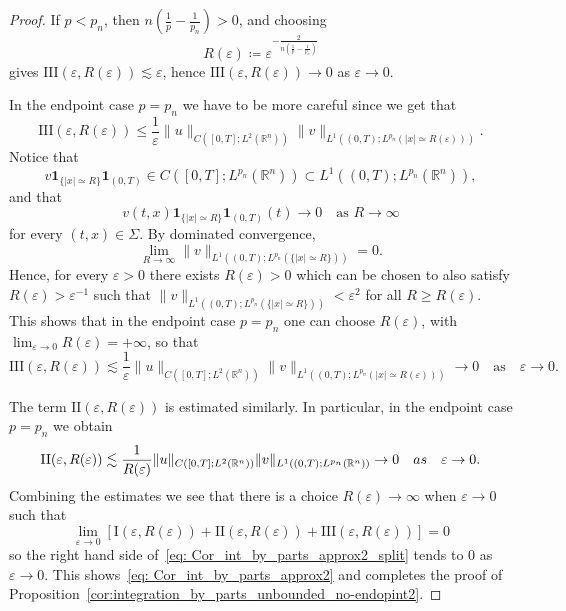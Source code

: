\documentclass[10pt,a4paper]{amsart}
\newcommand{\R}{\mathbb{R}}
\def\ind{\mathbf 1}
\def\ve{\varepsilon}
\begin{document}
\begin{proof}
If $p<p_n$, then $n(\frac1p-\frac1{p_n})>0$, and choosing
\[
R(\varepsilon)\coloneqq \varepsilon^{-\frac{2}{n(\frac1p-\frac1{p_n})}}
\]
gives $\mathrm{III}(\varepsilon,R(\varepsilon))\lesssim \varepsilon$, hence $\mathrm{III}(\varepsilon,R(\varepsilon))\to0$ as $\varepsilon\to0$.

In the endpoint case $p=p_n$ we have to be more careful since we get that
\[
\mathrm{III}(\ve,R(\ve))
\leq \frac{1}{\ve}  \|u\|_{C([0, T]; L^2(\R^n))}  \|v\|_{L^1\left((0, T); L^{ p_n}(|x|\simeq R(\ve))\right)} .
\]
Notice that
\[
v\ind_{\{|x|\simeq R\}}\ind _{(0,T)} \in C\left([0,T];L^{p_n}(\R^n)\right) \subset L^1\left((0,T);L^{p_n}(\R^n)\right),
\]
and that
\[
v(t,x)\ind_{\{|x|\simeq R\}}\ind_{(0,T)}(t)\to0 \quad\text{as }R\to\infty
\]
for every $(t,x)\in\Sigma$. By dominated convergence,
\[
\lim_{R\to\infty} \|v\|_{L^1((0,T);L^{p_n}(\{|x|\simeq R\}))}=0.
\]
Hence, for every $\ve>0$ there exists $R(\ve)>0$ which can be chosen to also satisfy $R(\ve)>\ve^{-1}$ such that $\|  v \|_{L^1((0,T); L^{p_n}(\{|x|\simeq R\}))}<\ve ^2$ for all $R\geq R(\ve)$. This shows that in the endpoint case $p=p_n$ one can choose $R(\ve)$, with $\lim_{\ve\to0 }R(\ve)=+\infty$, so that
\[
\mathrm{III}(\ve,R(\ve)) \lesssim \frac{1}{\ve}  \|u\|_{C([0, T]; L^2(\R^n))}  \|v\|_{L^1((0, T); L^{p_n}(|x|\simeq R(\ve)))} \to 0 \quad \text{as}\quad \ve\to 0.
\]

The term $\mathrm{II}(\varepsilon,R(\varepsilon))$ is estimated similarly. In particular, in the endpoint case $p=p_n$ we obtain
\[
\mathrm{II}(\ve,R(\ve)) \lesssim  \frac{1}{R(\ve)} \|u\|_{C([0, T]; L^2(\R^n))} \|v\|_{L^1((0, T); L^{p_n}(\R^n))} \to 0 \quad \textup{as} \quad \ve\to 0. 
\]
Combining the estimates we see that there is a choice $R(\ve)\to \infty$ when $\ve\to 0$ such that 
\[
\lim_{\ve\to 0} \left[\mathrm{I}(\ve,R(\ve))+\mathrm{II}(\ve,R(\ve))+\mathrm{III}(\ve,R(\ve))\right]=0
\]
so the right hand side of~\eqref{eq: Cor_int_by_parts_approx2_split} tends to 0 as $\ve\to 0$. This  shows~\eqref{eq: Cor_int_by_parts_approx2} and completes the proof of  Proposition~\ref{cor:integration_by_parts_unbounded_no-endopint2}. 
\end{proof}
\end{document}
